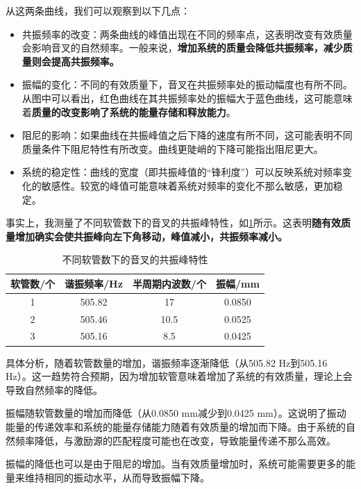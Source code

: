 \documentclass[dvipsnames, svgnames,a4paper,11pt]{article}
\begin{document}
	从这两条曲线，我们可以观察到以下几点：
	\begin{itemize}
		\item 共振频率的改变：两条曲线的峰值出现在不同的频率点，这表明改变有效质量会影响音叉的自然频率。一般来说，\textbf{增加系统的质量会降低共振频率，减少质量则会提高共振频率。}
		
		\item 振幅的变化：不同的有效质量下，音叉在共振频率处的振动幅度也有所不同。从图中可以看出，红色曲线在其共振频率处的振幅大于蓝色曲线，这可能意味着\textbf{质量的改变影响了系统的能量存储和释放能力}。
		
		\item 阻尼的影响：如果曲线在共振峰值之后下降的速度有所不同，这可能表明不同质量条件下阻尼特性有所改变。曲线更陡峭的下降可能指出阻尼更大。
		
		\item 系统的稳定性：曲线的宽度（即共振峰值的“锋利度”）可以反映系统对频率变化的敏感性。较宽的峰值可能意味着系统对频率的变化不那么敏感，更加稳定。
	\end{itemize}
	
	事实上，我测量了不同软管数下的音叉的共振峰特性，如\cref{tab:tab5}所示。这表明\textbf{随有效质量增加确实会使共振峰向左下角移动，峰值减小，共振频率减小。}
	
	\begin{table}[h]
		\centering
		\caption{不同软管数下的音叉的共振峰特性}
		\label{tab:tab5}
		\begin{tabular}{|c|c|c|c|}
			\hline
			软管数/个 & 谐振频率/Hz & 半周期内波数/个 & 振幅/mm \\
			\hline
			1 & 505.82 & 17 & 0.0850 \\
			2 & 505.46 & 10.5 & 0.0525 \\
			3 & 505.16 & 8.5 & 0.0425 \\
			\hline
		\end{tabular}
	\end{table}
	
	具体分析，随着软管数量的增加，谐振频率逐渐降低（从505.82 Hz到505.16 Hz）。这一趋势符合预期，因为增加软管意味着增加了系统的有效质量，理论上会导致自然频率的降低。
	
	振幅随软管数量的增加而降低（从0.0850 mm减少到0.0425 mm）。这说明了振动能量的传递效率和系统的能量存储能力随着有效质量的增加而下降。由于系统的自然频率降低，与激励源的匹配程度可能也在改变，导致能量传递不那么高效。
	
	振幅的降低也可以是由于阻尼的增加。当有效质量增加时，系统可能需要更多的能量来维持相同的振动水平，从而导致振幅下降。
	
\end{document}
